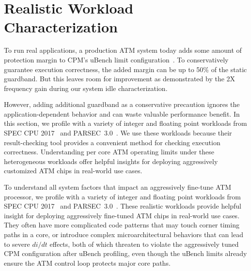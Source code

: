 
\section{Realistic Workload \\Characterization}
\label{sec:process:realistic}

To run real applications, a production ATM system today adds some amount of protection margin to CPM's uBench limit configuration~\cite{lefurgy2011active}. To conservatively guarantee execution correctness, the added margin can be up to 50\% of the static guardband. But this leaves room for improvement as demonstrated by the 2X frequency gain during our system idle characterization. 

However, adding additional guardband as a conservative precaution ignores the application-dependent behavior and can waste valuable performance benefit. In this section, we profile with a variety of integer and floating point workloads from SPEC CPU 2017~\cite{SPEC2017} and PARSEC~3.0~\cite{bienia2008parsec}. We use these workloads because their result-checking tool provides a convenient method for checking execution correctness. Understanding per core ATM operating limits under these heterogeneous workloads offer helpful insights for deploying aggressively customized ATM chips in real-world use cases.

To understand all system factors that impact an aggressively fine-tune ATM processor, we profile with a variety of integer and floating point workloads from SPEC CPU 2017~\cite{SPEC2017} and PARSEC~3.0~\cite{bienia2008parsec}. These realistic workloads provide helpful insight for deploying aggressively fine-tuned ATM chips in real-world use cases. They often have more complicated code patterns that may touch corner timing paths in a core, or introduce complex microarchitectural behaviors that can lead to severe $di/dt$ effects, both of which threaten to violate the aggressively tuned CPM configuration after uBench profiling, even though the uBench limits already ensure the ATM control loop protects major core paths. 


